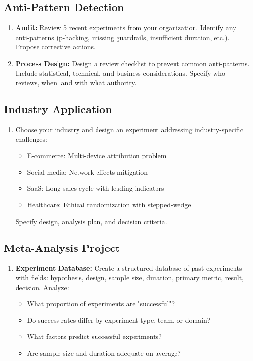 \subsection{Anti-Pattern Detection}

\begin{enumerate}
    \item \textbf{Audit:} Review 5 recent experiments from your organization. Identify any anti-patterns (p-hacking, missing guardrails, insufficient duration, etc.). Propose corrective actions.

    \item \textbf{Process Design:} Design a review checklist to prevent common anti-patterns. Include statistical, technical, and business considerations. Specify who reviews, when, and with what authority.
\end{enumerate}

\subsection{Industry Application}

\begin{enumerate}
    \item Choose your industry and design an experiment addressing industry-specific challenges:
    \begin{itemize}
        \item E-commerce: Multi-device attribution problem
        \item Social media: Network effects mitigation
        \item SaaS: Long-sales cycle with leading indicators
        \item Healthcare: Ethical randomization with stepped-wedge
    \end{itemize}

    Specify design, analysis plan, and decision criteria.
\end{enumerate}

\subsection{Meta-Analysis Project}

\begin{enumerate}
    \item \textbf{Experiment Database:} Create a structured database of past experiments with fields: hypothesis, design, sample size, duration, primary metric, result, decision. Analyze:
    \begin{itemize}
        \item What proportion of experiments are "successful"?
        \item Do success rates differ by experiment type, team, or domain?
        \item What factors predict successful experiments?
        \item Are sample size and duration adequate on average?
    \end{itemize}
\end{enumerate}
